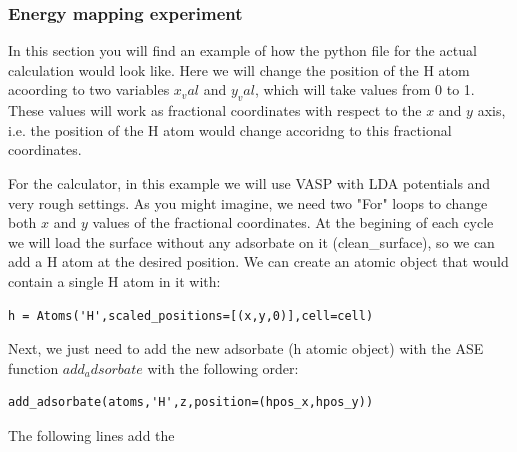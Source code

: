 \documentclass[11pt]{article}
\begin{document}
\subsubsection{Energy mapping experiment}
\label{sec:orgc5d1505}
In this section you will find an example of how the python file for the actual calculation would look like. Here we will change the position of the H atom acoording to two variables \(x_val\) and \(y_val\), which will take values from 0 to 1. These values will work as fractional coordinates with respect to the \(x\) and \(y\) axis, i.e. the position of the H atom would change accoridng to this fractional coordinates.

For the calculator, in this example we will use VASP with LDA potentials and very rough settings. As you might imagine, we need two "For" loops to change both \(x\) and \(y\) values of the fractional coordinates. At the begining of each cycle we will load the surface without any adsorbate on it (clean\_surface), so we can add a H atom at the desired position. We can create an atomic object that would contain a single H atom in it with:
\begin{verbatim}
h = Atoms('H',scaled_positions=[(x,y,0)],cell=cell)
\end{verbatim}

Next, we just need to add the new adsorbate (h atomic object) with the ASE function \(add_adsorbate\) with the following order:

\begin{verbatim}
add_adsorbate(atoms,'H',z,position=(hpos_x,hpos_y))
\end{verbatim}

The following lines add the 
\end{document}
